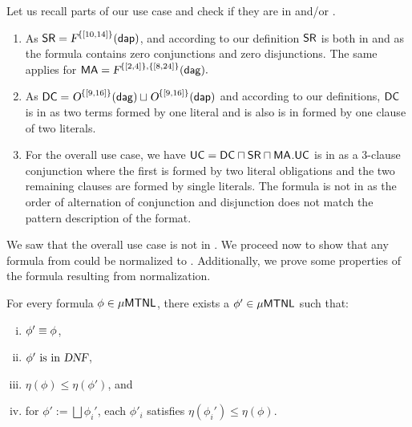 \begin{example}\label{example nnf}
Let us recall parts of our use case and check if they are in  \cnf and/or \dnf.
\begin{enumerate}
\item As $\mathsf{SR}= \textsl{F}^{\{[10,14]\}}(\mathsf{\mathsf{dap}})$, and according to our definition $\mathsf{SR}$ is both in \cnf and \dnf as the formula contains zero conjunctions and zero disjunctions. The same applies for $\mathsf{MA}=\textsl{F}^{\{[2,4]\},\{[8,24]\}}(\mathsf{\mathsf{dag}}).$

\item As $\mathsf{DC} = \textsl{O}^{\{[9,16]\}}(\mathsf{\mathsf{dag}}) \sqcup \textsl{O}^{\{[9,16]\}}(\mathsf{\mathsf{dap}})$ and according to our definitions, $\mathsf{DC}$ is in \dnf as two terms formed by one literal and is also is in \cnf formed by one clause of two literals.

\item For the overall use case, we have $\mathsf{UC}= \mathsf{DC} \sqcap \mathsf{SR} \sqcap \mathsf{MA}$.$\mathsf{UC}$ is in \cnf as a 3-clause conjunction where the first is formed by two literal obligations and the two remaining clauses are formed by single literals. The formula is not in \dnf as the order of alternation of conjunction and disjunction does not match the pattern description of the format.
\end{enumerate}
\end{example}

We saw that the overall use case is not in \dnf. We proceed now to show that any formula from \TDDLfm could be normalized to \dnf. Additionally, we prove some properties of the formula resulting from normalization.
\begin{lemma}
\label{lem:dnf}
For every formula \(\phi \in \mathsf{\mu MTNL}\), there exists a \(\phi'\in \mathsf{\mu MTNL}\) such that:
\begin{enumerate}[(i)]
\item   $\phi' \equiv  \phi$,
\item $ \phi' \text{ is in } \textsl{DNF}$,
    \item \(\eta(\phi) \leq \eta(\phi')\), and
    \item for \(\phi' := \bigsqcup \phi_i'\), each $\phi'_i$ satisfies \(\eta(\phi_i') \leq \eta(\phi)\).
\end{enumerate}
\end{lemma}

